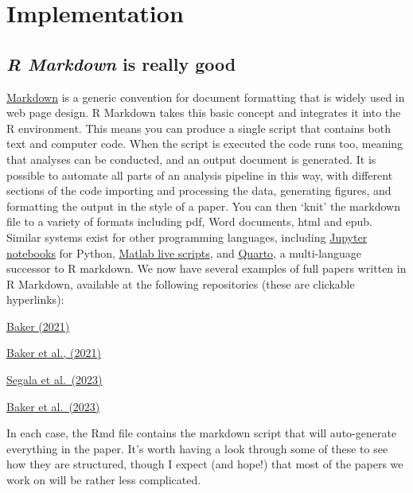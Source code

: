 \documentclass[
]{article}
\begin{document}
\hypertarget{implementation}{%
\section{Implementation}\label{implementation}}

\hypertarget{r-markdown-is-really-good}{%
\subsection{\texorpdfstring{\emph{R Markdown} is really good}{R Markdown is really good}}\label{r-markdown-is-really-good}}

\href{https://www.markdownguide.org/}{Markdown} is a generic convention for document formatting that is widely used in web page design. R Markdown takes this basic concept and integrates it into the R environment. This means you can produce a single script that contains both text and computer code. When the script is executed the code runs too, meaning that analyses can be conducted, and an output document is generated. It is possible to automate all parts of an analysis pipeline in this way, with different sections of the code importing and processing the data, generating figures, and formatting the output in the style of a paper. You can then `knit' the markdown file to a variety of formats including pdf, Word documents, html and epub. Similar systems exist for other programming languages, including \href{https://jupyter.org/}{Jupyter notebooks} for Python, \href{https://uk.mathworks.com/help/matlab/matlab_prog/what-is-a-live-script-or-function.html}{Matlab live scripts}, and \href{https://quarto.org/}{Quarto}, a multi-language successor to R markdown. We now have several examples of full papers written in R Markdown, available at the following repositories (these are clickable hyperlinks):

\href{https://github.com/bakerdh/FourierStats}{Baker (2021)}

\href{https://osf.io/e62wu/}{Baker et al., (2021)}

\href{https://doi.org/10.17605/OSF.IO/TBEMA}{Segala et al.~(2023)}

\href{https://doi.org/10.17605/OSF.IO/AB3YV}{Baker et al.~(2023)}

In each case, the Rmd file contains the markdown script that will auto-generate everything in the paper. It's worth having a look through some of these to see how they are structured, though I expect (and hope!) that most of the papers we work on will be rather less complicated.
\end{document}
